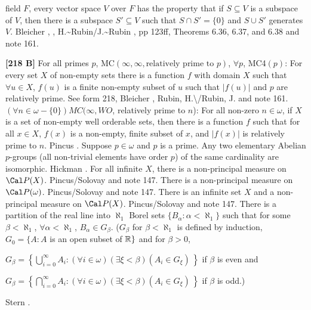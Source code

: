 field $F$, every vector space $V$ over $F$ has the property that if
$S\subseteq V$ is a subspace of $V$, then there is a subspace $S'\subseteq
V$ such that $S\cap S'= \{0\}$ and $S\cup S'$ generates $V$. \ac{Bleicher}
\cite{1964}, \cite{1965}, \ac{H.~Rubin/J.~Rubin} \cite{1985}, pp 123ff,
Theorems 6.36, 6.37, and 6.38 and note 161.
\smallskip
\item{}{\bf [218 B]} For all primes $p$, MC$(\infty,\infty,\text{
relatively prime to $p$})$, $\forall p$, MC4$(p)$:  For every set $X$ of
non-empty sets there is a function $f$ with domain $X$ such that $\forall
u \in X$, $f(u)$ is a finite non-empty subset of $u$ such that  $|f(u)|$
and $p$ are relatively prime. See form 218, \ac{Bleicher} \cite{1964},
\ac{Rubin, H.\/Rubin, J.} \cite{1985, p.124} and note 161.
\medskip
{}  $(\forall n\in\omega-\{0\}) MC(\infty,WO$,
relatively prime to $n$): For all non-zero $n\in \omega$, if $X$ is a set
of non-empty well orderable sets, then there is a function $f$ such that
for all $x\in X$, $f(x)$ is a non-empty, finite subset of $x$,
and $|f(x)|$ is relatively prime to $n$.  \ac{Pincus} \cite{1972a}.
\medskip
{} Suppose $p\in\omega$ and $p$ is a prime.
Any two elementary Abelian $p$-groups (all non-trivial elements have
order $p$) of the same cardinality are isomorphic. \ac{Hickman}
\cite{1977b}.
\medskip
{} For all infinite $X$, there is a non-principal
measure on $\Cal P(X)$.  \ac{Pincus/Solovay} \cite{1977} and note 147.
\medskip
{} There is a non-principal measure on
$\Cal P(\omega)$.  \ac{Pincus/Solovay} \cite{1977} and note 147.
\medskip
{} There is an infinite set $X$ and a non-principal
measure on $\Cal P(X)$.  \ac{Pincus/Solovay} \cite{1977} and note 147.
\medskip
{}  There is a partition of the real line into
$\aleph_1$ Borel sets $\{B_\alpha: \alpha<\aleph_1\}$ such that for some
$\beta <\aleph_1$, $\forall\alpha <\aleph_1$, $B_{\alpha}\in G_{\beta}$.
($G_\beta$ for $\beta < \aleph_1$ is defined by induction, $G_0=\{A: A$
is an open subset of ${\Bbb R}\}$ and for $\beta > 0$,
\item{}$G_\beta =\left\{\bigcup^\infty_{i=0}A_{i}: (\forall i\in\omega)
(\exists\xi <\beta)(A_i\in G_\xi)\,\right\}$ if $\beta$ is even and
\item{}$G_\beta = \left\{\bigcap^\infty_{i=0}A_{i}: (\forall i\in\omega)
(\exists \xi < \beta)(A_{i}\in G_\xi)\,\right\}$ if $\beta$ is odd.)
\item{}\ac{Stern} \cite{1979}.
